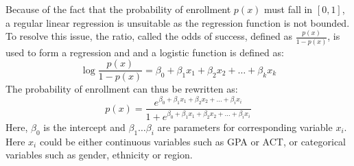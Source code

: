 \documentclass[12pt,english]{report}
\begin{document}
Because of the fact that the probability of enrollment $p(x)$ must fall in
$[0,1]$, a regular linear regression is unsuitable as the regression function
is not bounded. To resolve this issue, the ratio, called the odds of success,
defined as  $\frac{p(x)}{1-p(x)}$,  is used to form a regression and and a
logistic function is defined as:
\begin{equation}
\ensuremath{\log\frac{p(x)}{1-p(x)}=\beta_0+\beta_1 x_1+\beta_2 x_2
+\ldots+\beta_k x_k}
\end{equation}
The probability of enrollment can thus be rewritten as:
\begin{equation}
p(x)=\frac{e^{\beta_0+\beta_1 x_1+\beta_2 x_2 +\ldots+\beta_i
x_i}}{1+e^{\beta_0+\beta_1 x_1+\beta_2 x_2 +\ldots+\beta_i
x_i}}%
\end{equation}
Here, $\beta_0$ is the intercept and $\beta_1 \ldots \beta_i$ are parameters
for corresponding variable $x_i$.  Here $x_i$ could be either continuous
variables such as GPA or  ACT, or categorical variables such as gender,
ethnicity or region.

\end{document}
